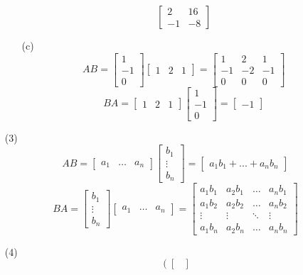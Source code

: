 \begin{itemize}
\begin{itemize}
$$\begin{bmatrix}
2 & 16 \\
-1 & -8
\end{bmatrix}$$
\item[(c)]
$$AB = \begin{bmatrix}
1 \\
-1 \\
0
\end{bmatrix}\begin{bmatrix}
1 & 2 & 1
\end{bmatrix} = \begin{bmatrix}
1 & 2 & 1 \\
-1 & -2 & -1 \\
0 & 0 & 0
\end{bmatrix}$$
$$BA = \begin{bmatrix}
1 & 2 & 1
\end{bmatrix}\begin{bmatrix}
1 \\
-1 \\
0
\end{bmatrix} = \begin{bmatrix}
-1
\end{bmatrix}$$
\end{itemize}
\item[(3)]
$$AB = \begin{bmatrix}
a_1 & \hdots & a_n
\end{bmatrix}\begin{bmatrix}
b_1 \\
\vdots \\
b_n
\end{bmatrix} = \begin{bmatrix}
a_1b_1 + ... + a_nb_n
\end{bmatrix}$$
$$BA = \begin{bmatrix}
b_1 \\
\vdots \\
b_n
\end{bmatrix}\begin{bmatrix}
a_1 & \hdots & a_n
\end{bmatrix} = \begin{bmatrix}
a_1b_1 & a_2b_1 & \hdots & a_nb_1 \\
a_1b_2 & a_2b_2 & \hdots & a_nb_2 \\
\vdots & \vdots & \ddots & \vdots \\
a_1b_n & a_2b_n & \hdots & a_nb_n
\end{bmatrix}$$
\item[(4)]
$$\left( \begin{bmatrix}

\end{bmatrix}$$
\end{itemize}
